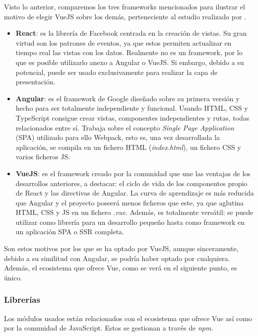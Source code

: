 Visto lo anterior, comparemos los tres frameworks mencionados para ilustrar el motivo de elegir VueJS sobre los demás, perteneciente al estudio realizado por .

\begin{itemize}
    \item \textbf{React}: es la librería de Facebook centrada en la creación de vistas. Su gran virtud son los patrones de eventos, ya que estos permiten actualizar en tiempo real las vistas con los datos. Realmente no es un framework, por lo que es posible utilizarlo anexo a Angular o VueJS. Si embargo, debido a su potencial, puede ser usado exclusivamente para realizar la capa de presentación.
    \item \textbf{Angular}: es el framework de Google diseñado sobre su primera versión y hecho para ser totalmente independiente y funcional. Usando HTML, CSS y TypeScript consigue crear vistas, componentes independientes y rutas, todas relacionados entre sí. Trabaja sobre el concepto \textit{Single Page Application} (SPA) utilizado para ello Webpack, esto es, una vez desarrollada la aplicación, se compila en un fichero HTML (\textit{index.html}), un fichero CSS y varios ficheros JS.
    \item \textbf{VueJS}: es el framework creado por la comunidad que une las ventajas de los desarrollos anteriores, a destacar: el ciclo de vida de los componentes propio de React y las directivas de Angular. La curva de aprendizaje es más reducida que Angular y el proyecto poseerá menos ficheros que este, ya que aglutina HTML, CSS y JS en un fichero \textit{.vue}. Además, es totalmente versátil: se puede utilizar como librería para un desarrollo pequeño hasta como framework en un aplicación SPA o SSR completa.
\end{itemize}

Son estos motivos por los que se ha optado por VueJS, aunque sinceramente, debido a su similitud con Angular, se podría haber optado por cualquiera. Además, el ecosistema que ofrece Vue, como se verá en el siguiente punto, es único.

\subsubsection{Librerías}

Los módulos usados están relacionados con el ecosistema que ofrece Vue así como por la comunidad de JavaScript. Estos se gestionan a través de \textit{npm}.

